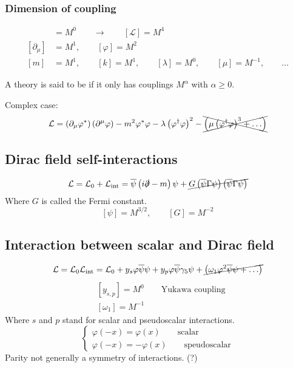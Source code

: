 \subsubsection{Dimension of coupling}
\begin{align*}
[S] &= M^0 \qquad \to \qquad [\mathcal{L} ] = M^4\\
[\partial_\mu] &= M^1, \qquad [\varphi] = M^2\\
[m] &= M^1, \qquad [k]=M^1, \qquad [\lambda] = M^0, \qquad [\mu] = M^{-1}, \qquad \ldots
\end{align*}
\begin{definition}
A theory is said to be  if it only has couplings $M^\alpha$ with $\alpha \geq 0$.
\end{definition}
Complex case:
\[ \mathcal{L} = \left(\partial_\mu\varphi^*\right)\left(\partial^\mu\varphi\right)- m^2\varphi^*\varphi - \lambda \left(\varphi^\dagger\varphi\right)^2 - \xcancel{\left(\mu\left(\varphi^\dagger\varphi\right)^3+\ldots\right)} \]

\subsection{Dirac field self-interactions}
\[ \mathcal{L}  = \mathcal{L} _0 + \mathcal{L} _\text{int} = \overline{\psi}\left(i\slashed{\partial}-m\right)\psi + \cancel{G \left(\overline{\psi}\Gamma\psi\right)\left(\overline{\psi}\Gamma\psi\right)} \]
Where $G$ is called the Fermi constant.
\[ [\psi]= M^{3/2}, \qquad [G] = M^{-2} \]

\subsection{Interaction between scalar and Dirac field}
\[ \mathcal{L}  = \mathcal{L} _0 \mathcal{L} _\text{int} = \mathcal{L} _0 + y_s\varphi \overline{\psi}\psi + y_p\varphi \overline{\psi}\gamma_5\psi + \cancel{\left(\omega_1\varphi^2 \overline{\psi}\psi + \ldots \right)} \]
\begin{align*}
&[y_{s,p}] = M^0 \qquad \text{Yukawa coupling} \\
&[\omega_1] = M^{-1}
\end{align*}
Where $s$ and $p$ stand for scalar and pseudoscalar interactions.
\[ \begin{cases}
\varphi(-x) = \varphi(x) \qquad \text{scalar} \\
\varphi(-x) = -\varphi(x) \qquad \text{speudoscalar}
\end{cases} \]
Parity not generally a symmetry of interactions. (?)

